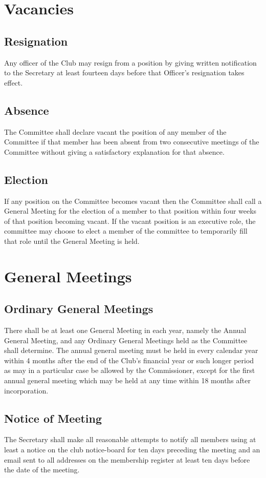 \documentclass[11pt]{article} %
\begin{document}
\section{Vacancies}
\subsection{Resignation}
Any officer of the Club may resign from a position by giving written notification to the Secretary at least fourteen days before that Officer's resignation takes effect.
\subsection{Absence}
The Committee shall declare vacant the position of any member of the Committee if that member has been absent from two consecutive meetings of the Committee without giving a satisfactory explanation for that absence.
\subsection{Election}
If any position on the Committee becomes vacant then the Committee shall call a General Meeting for the election of a member to that position within four weeks of that position becoming vacant.
{\color{ForestGreen}If the vacant position is an executive role, the committee may choose to elect a member of the committee to temporarily fill that role until the General Meeting is held.}

\section{General Meetings}
\subsection{Ordinary General Meetings}
There shall be at least one General Meeting in each year, namely the Annual General Meeting, and any Ordinary General Meetings held as the Committee shall determine. The annual general meeting must be held in every calendar year within 4 months after the end of the Club's financial year or such longer period as may in a particular case be allowed by the Commissioner, except for the first annual general meeting which may be held at any time within 18 months after incorporation.
\subsection{Notice of Meeting}
The Secretary shall make all reasonable attempts to notify all members using at least a notice on the club notice-board for ten days preceding the meeting and an email sent to all addresses on the membership register at least ten days before the date of the meeting.
\end{document}
